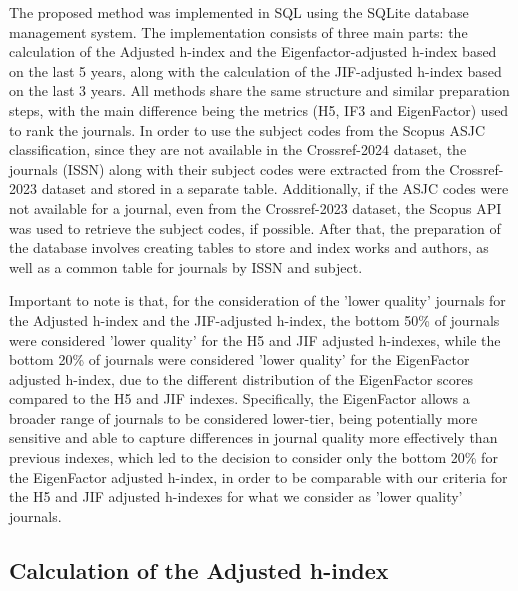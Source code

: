 The proposed method was implemented in SQL using the SQLite database management
system. The implementation consists of three main parts: the calculation of the
Adjusted h-index and the Eigenfactor-adjusted h-index based on the last 5
years, along with the calculation of the JIF-adjusted h-index based on the last
3 years. All methods share the same structure and similar preparation steps,
with the main difference being the metrics (H5, IF3 and EigenFactor) used to
rank the journals. In order to use the subject codes from the Scopus ASJC
classification, since they are not available in the Crossref-2024 dataset, the
journals (ISSN) along with their subject codes were extracted from the
Crossref-2023 dataset and stored in a separate table. Additionally, if the ASJC
codes were not available for a journal, even from the Crossref-2023 dataset,
the Scopus API was used to retrieve the subject codes, if possible. After that,
the preparation of the database involves creating tables to store and index
works and authors, as well as a common table for journals by ISSN and subject.

Important to note is that, for the consideration of the 'lower quality'
journals for the Adjusted h-index and the JIF-adjusted h-index, the bottom 50\%
of journals were considered 'lower quality' for the H5 and JIF adjusted
h-indexes, while the bottom 20\% of journals were considered 'lower quality'
for the EigenFactor adjusted h-index, due to the different distribution of the
EigenFactor scores compared to the H5 and JIF indexes. Specifically, the
EigenFactor allows a broader range of journals to be considered lower-tier,
being potentially more sensitive and able to capture differences in journal
quality more effectively than previous indexes, which led to the decision to
consider only the bottom 20\% for the EigenFactor adjusted h-index, in order to
be comparable with our criteria for the H5 and JIF adjusted h-indexes for
what we consider as 'lower quality' journals.

\subsection{Calculation of the Adjusted h-index}

